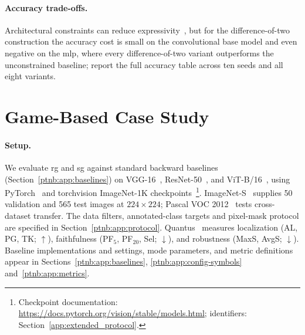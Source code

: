 \paragraph{Accuracy trade-offs.}\label{subsec:dcinn_accuracy}

Architectural constraints can reduce expressivity~\parencite{Sill1997_MonotonicNetworks,Liu2020CertifiedMonotone}, but for the difference-of-two construction the accuracy cost is small on the convolutional base model and even negative on the \ac{mlp}, where every difference-of-two variant outperforms the unconstrained baseline; \textcite{hiddenMono} report the full accuracy table across ten seeds and all eight variants.

\section{Game-Based Case Study}\label{sec:results_vit}\label{sec:saliency_results}\label{ptnb:sec:experiments}\label{ptnb:sec:case-study}



\paragraph{Setup.}
We evaluate \ac{rg} and \ac{sg} against standard backward baselines (Section~\ref{ptnb:app:baselines}) on VGG-16~\parencite{Simonyan2015}, ResNet-50~\parencite{He2016resnet}, and ViT-B/16~\parencite{Dosovitskiy2021vit}, using PyTorch~\parencite{Paszke2019PyTorch} and torchvision ImageNet-1K checkpoints~\parencite{Deng2009,Russakovsky2015ilsvrc}\footnote{Checkpoint documentation: \url{https://docs.pytorch.org/vision/stable/models.html}; identifiers: Section~\ref{app:extended_protocol}.}. ImageNet-S~\parencite{gao2022luss} supplies 50 validation and 565 test images at $224{\times}224$; Pascal VOC 2012~\parencite{Everingham2010voc} tests cross-dataset transfer. The data filters, annotated-class targets and pixel-mask protocol are specified in Section~\ref{ptnb:app:protocol}. Quantus~\parencite{Hedstrom2023} measures localization (AL, PG, TK; $\uparrow$), faithfulness (PF$_5$, PF$_{20}$, Sel; $\downarrow$), and robustness (MaxS, AvgS; $\downarrow$). Baseline implementations and settings, mode parameters, and metric definitions appear in Sections~\ref{ptnb:app:baselines}, \ref{ptnb:app:config-symbols} and~\ref{ptnb:app:metrics}.

